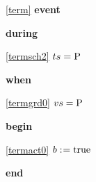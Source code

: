 \noindent \ref{term}  \textbf{event}
\begin{block}
  \item   \textbf{during}
  \begin{block}
  \item[ \eqref{termsch2} ]$ts = \text{P} $ %
  \end{block}
  \item   \textbf{when}
  \begin{block}
  \item[ \eqref{termgrd0} ]$vs = \text{P}$ %
  \end{block}
  \item   \textbf{begin}
  \begin{block}
  \item[ \eqref{termact0} ]$b \mathrel{:\mkern1mu=} \text{true} $ %
  \end{block}
  \item   \textbf{end} \\
\end{block}

